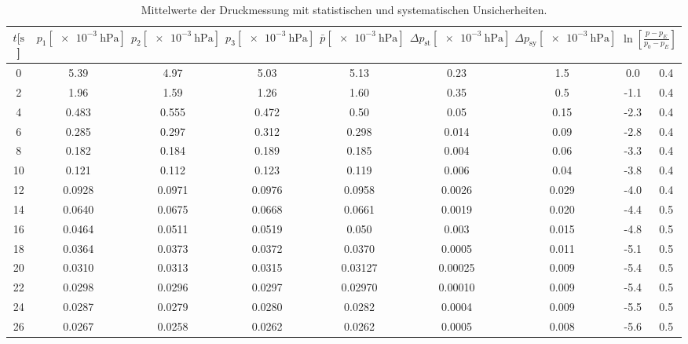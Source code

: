 \begin{table}[H]
  \centering
    \caption{Mittelwerte der Druckmessung mit statistischen und systematischen Unsicherheiten.}
    \label{tab:Turbo_Evak}
    \tiny{
    \begin{tabular}{
      S[table-format=2.0] 
      S[table-format=1.4] S[table-format=1.4] S[table-format=1.4]
      S[table-format=1.5] S[table-format=1.5] S[table-format=1.4] S @{${}\pm{}$} S
      }
      \toprule
      {$t [\si{\second}$]} & 
      {$p_1 [\SI{e-3}{\hecto\pascal}]$} & 
      {$p_2 [\SI{e-3}{\hecto\pascal}]$} & 
      {$p_3 [\SI{e-3}{\hecto\pascal}]$} & 
      {$\bar{p} [\SI{e-3}{\hecto\pascal}]$} & 
      {$\Delta p_\text{st} [\SI{e-3}{\hecto\pascal}]$} & 
      {$\Delta p_\text{sy} [\SI{e-3}{\hecto\pascal}]$} & 
       \\
         & 5.39   & 4.97   & 5.03   & 5.13    & 0.23    & 1.5   &  0.0 & 0.4\\ 
      2   & 1.96   & 1.59   & 1.26   & 1.60    & 0.35    & 0.5   & -1.1 & 0.4\\ 
      4   & 0.483  & 0.555  & 0.472  & 0.50    & 0.05    & 0.15  & -2.3 & 0.4\\ 
      6   & 0.285  & 0.297  & 0.312  & 0.298   & 0.014   & 0.09  & -2.8 & 0.4\\ 
      8   & 0.182  & 0.184  & 0.189  & 0.185   & 0.004   & 0.06  & -3.3 & 0.4\\ 
      10  & 0.121  & 0.112  & 0.123  & 0.119   & 0.006   & 0.04  & -3.8 & 0.4\\ 
      12  & 0.0928 & 0.0971 & 0.0976 & 0.0958  & 0.0026  & 0.029 & -4.0 & 0.4\\ 
      14  & 0.0640 & 0.0675 & 0.0668 & 0.0661  & 0.0019  & 0.020 & -4.4 & 0.5\\ 
      16  & 0.0464 & 0.0511 & 0.0519 & 0.050   & 0.003   & 0.015 & -4.8 & 0.5\\ 
      18  & 0.0364 & 0.0373 & 0.0372 & 0.0370  & 0.0005  & 0.011 & -5.1 & 0.5\\ 
      20  & 0.0310 & 0.0313 & 0.0315 & 0.03127 & 0.00025 & 0.009 & -5.4 & 0.5\\ 
      22  & 0.0298 & 0.0296 & 0.0297 & 0.02970 & 0.00010 & 0.009 & -5.4 & 0.5\\ 
      24  & 0.0287 & 0.0279 & 0.0280 & 0.0282  & 0.0004  & 0.009 & -5.5 & 0.5\\ 
      26  & 0.0267 & 0.0258 & 0.0262 & 0.0262  & 0.0005  & 0.008 & -5.6 & 0.5\\ 

\end{tabular}}
\end{table}
